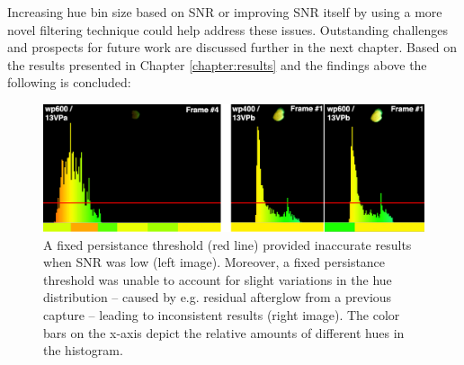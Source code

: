 \documentclass[thesis.tex]{subfiles}
\begin{document}
Increasing hue bin size based on SNR or improving SNR itself by using a more novel filtering technique could help address these issues. Outstanding challenges and prospects for future work are discussed further in the next chapter. Based on the results presented in Chapter \ref{chapter:results} and the findings above the following is concluded:

\begin{figure}[h!]
  \centering \includegraphics[page=1,width=\textwidth]{images/findings/persistance_pitfall}
  \caption{A fixed persistance threshold (red line) provided inaccurate results when SNR was low (left image). Moreover, a fixed persistance threshold was unable to account for slight variations in the hue distribution -- caused by e.g. residual afterglow from a previous capture -- leading to inconsistent results (right image). The color bars on the x-axis depict the relative amounts of different hues in the histogram.}
  \label{figure:fingerprint-method-pitfalls}
\end{figure}
\end{document}
